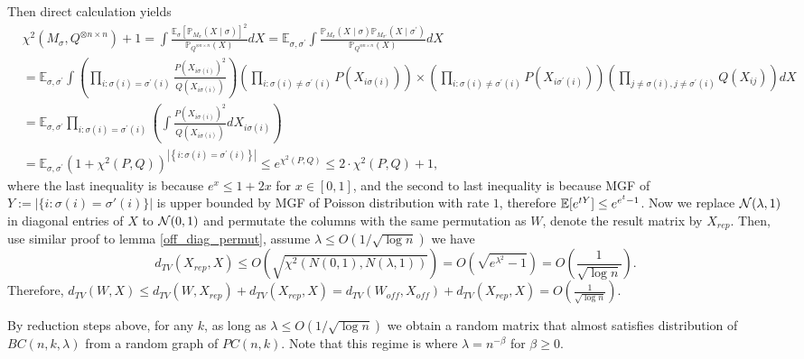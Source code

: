 \begin{enumerate}
{            Then direct calculation yields
            \begin{align*}
                &\chi^2\left(M_\sigma, Q^{\otimes n \times n}\right)+1
                =\int \frac{\mathbb{E}_\sigma\left[\mathbb{P}_{M_\sigma}(X \mid \sigma)\right]^2}{\mathbb{P}_{Q^{\otimes n \times n}}(X)} d X
                =\mathbb{E}_{\sigma, \sigma^{\prime}} \int \frac{\mathbb{P}_{M_\sigma}(X \mid \sigma) \mathbb{P}_{M_{\sigma'}}\left(X \mid \sigma^{\prime}\right)}{\mathbb{P}_{Q^{\otimes n \times n}}(X)} d X\\
                &= \mathbb{E}_{\sigma, \sigma^{\prime}} \int\left(\prod_{i: \sigma(i)=\sigma^{\prime}(i)} 
                \frac{P\left(X_{i \sigma(i)}\right)^2}{Q\left(X_{i \sigma(i)}\right)}\right)\left(\prod_{i: \sigma(i) \neq \sigma^{\prime}(i)} P\left(X_{i \sigma(i)}\right)\right) 
                 \times\left(\prod_{i: \sigma(i) \neq \sigma^{\prime}(i)} P\left(X_{i \sigma^{\prime}(i)}\right)\right)\left(\prod_{j \neq \sigma(i), j \neq \sigma^{\prime}(i)} Q\left(X_{i j}\right)\right) d X \\
                & =\mathbb{E}_{\sigma, \sigma^{\prime}}\prod_{i: \sigma(i)=\sigma^{\prime}(i)}\left(\int \frac{P\left(X_{i \sigma(i)}\right)^2}{Q\left(X_{i \sigma(i)}\right)} d X_{i \sigma(i)}\right) \\
                & =\mathbb{E}_{\sigma, \sigma^{\prime}}\left(1+\chi^2(P, Q)\right)^{\left|\left\{i: \sigma(i)=\sigma^{\prime}(i)\right\}\right|}
                \le e^{\chi^2(P,Q)} \le 2\cdot\chi^2(P,Q) + 1,
            \end{align*}
            where the last inequality is because $e^x\le1+2x$ for $x\in[0,1]$, and the second to last inequality is because MGF of $Y:=|\{i:\sigma(i)=\sigma'(i)\}|$ is upper bounded by MGF of Poisson distribution with rate $1$,
            therefore $\mathbb{E}[e^{tY}]\le e^{e^t-1}$. 
        }
        Now we replace $\mathcal{N}(\lambda,1)$ in diagonal entries of $X$ to $\mathcal{N}(0,1)$ and permutate the columns with the same permutation as $W$, denote the result matrix by $X_{rep}$. Then,
        use similar proof to lemma \ref{off_diag_permut}, assume $\lambda\le O(1/\sqrt{\log n})$ we have
        \[
            d_{TV}(X_{rep}, X)\le O(\sqrt{\chi^2(N(0,1),N(\lambda,1))})=O(\sqrt{e^{\lambda^2}-1})=O\left(\frac{1}{\sqrt{\log n}}\right).
        \]
        Therefore, $d_{TV}(W, X)\le d_{TV}(W, X_{rep}) + d_{TV}(X_{rep}, X)=d_{TV}(W_{off},X_{off}) + d_{TV}(X_{rep}, X)=O\left(\frac{1}{\sqrt{\log n}}\right)$.
\end{enumerate}
By reduction steps above, for any $k$, as long as $\lambda\le O(1/\sqrt{\log n})$ we obtain a random matrix that almost satisfies distribution of $BC(n,k,\lambda)$ from a random graph of $PC(n,k)$. 
Note that this regime is where $\lambda=n^{-\beta}$ for $\beta\ge 0$. 

